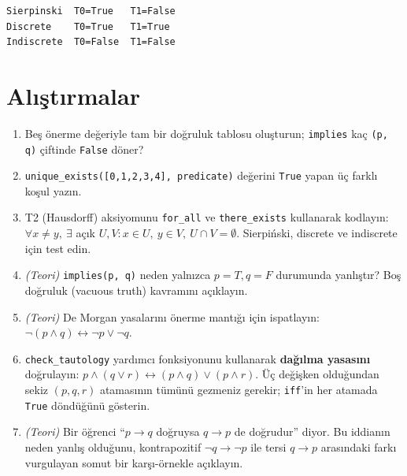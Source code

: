\begin{lstlisting}[style=output]
Sierpinski  T0=True   T1=False
Discrete    T0=True   T1=True
Indiscrete  T0=False  T1=False
\end{lstlisting}

\section{Alıştırmalar}
\label{sec:logic_exercises}

\begin{enumerate}
  \item Beş önerme değeriyle tam bir doğruluk tablosu oluşturun; \texttt{implies}
        kaç \texttt{(p, q)} çiftinde \texttt{False} döner?

  \item \texttt{unique\_exists([0,1,2,3,4], predicate)} değerini \texttt{True}
        yapan üç farklı koşul yazın.

  \item T2 (Hausdorff) aksiyomunu \texttt{for\_all} ve \texttt{there\_exists}
        kullanarak kodlayın:
        $\forall x \neq y,\ \exists$ açık $U,V : x \in U,\ y \in V,\ U \cap V = \emptyset$.
        Sierpiński, discrete ve indiscrete için test edin.

  \item \textit{(Teori)} \texttt{implies(p, q)} neden yalnızca $p = T, q = F$
        durumunda yanlıştır? Boş doğruluk (vacuous truth) kavramını açıklayın.

  \item \textit{(Teori)} De Morgan yasalarını önerme mantığı için ispatlayın:
        $\neg(p \wedge q) \leftrightarrow \neg p \vee \neg q$.

  \item \texttt{check\_tautology} yardımcı fonksiyonunu kullanarak
        \textbf{dağılma yasasını} doğrulayın:
        $p \wedge (q \vee r) \leftrightarrow (p \wedge q) \vee (p \wedge r)$.
        Üç değişken olduğundan sekiz $(p, q, r)$ atamasının tümünü gezmeniz
        gerekir; \texttt{iff}'in her atamada \texttt{True} döndüğünü gösterin.

  \item \textit{(Teori)} Bir öğrenci ``$p \to q$ doğruysa $q \to p$ de
        doğrudur'' diyor. Bu iddianın neden yanlış olduğunu, kontrapozitif
        $\neg q \to \neg p$ ile tersi $q \to p$ arasındaki farkı vurgulayan
        somut bir karşı-örnekle açıklayın. 
\end{enumerate}
